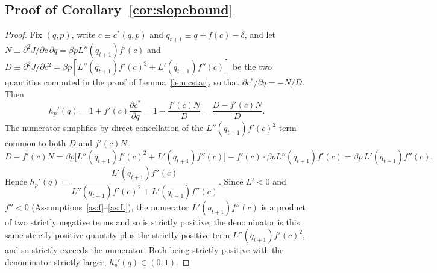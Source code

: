 \subsection{Proof of Corollary~\ref{cor:slopebound}}
\begin{proof}
Fix $(q,p)$, write $c\equiv c^*(q,p)$ and $q_{t+1}\equiv q+f(c)-\delta$, and let $N \equiv \partial^2J/\partial c\,\partial q = \beta p L''(q_{t+1})f'(c)$ and $D \equiv \partial^2J/\partial c^2 = \beta p[L''(q_{t+1})f'(c)^2+L'(q_{t+1})f''(c)]$ be the two quantities computed in the proof of Lemma~\ref{lem:cstar}, so that $\partial c^*/\partial q = -N/D$. Then
\[
h_p'(q) = 1+f'(c)\frac{\partial c^*}{\partial q} = 1 - \frac{f'(c)N}{D} = \frac{D-f'(c)N}{D}.
\]
The numerator simplifies by direct cancellation of the $L''(q_{t+1})f'(c)^2$ term common to both $D$ and $f'(c)N$:
\[
D - f'(c)N = \beta p\big[L''(q_{t+1})f'(c)^2+L'(q_{t+1})f''(c)\big] - f'(c)\cdot\beta p L''(q_{t+1})f'(c) = \beta p\, L'(q_{t+1})f''(c).
\]
Hence $h_p'(q) = \dfrac{L'(q_{t+1})f''(c)}{L''(q_{t+1})f'(c)^2+L'(q_{t+1})f''(c)}$. Since $L'<0$ and $f''<0$ (Assumptions~\ref{as:f}--\ref{as:L}), the numerator $L'(q_{t+1})f''(c)$ is a product of two strictly negative terms and so is strictly positive; the denominator is this same strictly positive quantity plus the strictly positive term $L''(q_{t+1})f'(c)^2$, and so strictly exceeds the numerator. Both being strictly positive with the denominator strictly larger, $h_p'(q) \in (0,1)$.
\end{proof}


